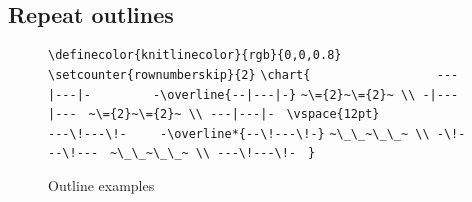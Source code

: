 \documentclass[draft]{amsart}
\begin{document}
\subsection{Repeat outlines}

\begin{figure}
\caption{Outline examples}\label{fig:outlineex}

\advance\hsize 60pt
\noindent \hskip -30pt
\begin{minipage}[b]{3in}
\obeylines
\verb?\definecolor{knitlinecolor}{rgb}{0,0,0.8}?
\verb?\setcounter{rownumberskip}{2}?
\verb?\chart{?
\verb?                 ---|---|- ?
\verb?       -\overline{--|---|-}?
\verb?~\={2}~\={2}~ \\ -|---|--- ?
\verb?~\={2}~\={2}~ \\ ---|---|- ?
\verb?\vspace{12pt}?
\verb?                ---\!---\!-?
\verb?    -\overline*{--\!---\!-}?
\verb?~\_\_~\_\_~ \\ -\!---\!--- ?
\verb?~\_\_~\_\_~ \\ ---\!---\!- ?
\vspace{0pt}
\verb?}?
\end{minipage}%
\hfill
\begin{minipage}[b]{105pt}
\knitnogrid
{}
\setcounter{rownumberskip}{2}
\vspace{0pt}
\end{minipage}%
\hfill
\begin{minipage}[b]{110pt}
\knitgrid
{}
\setcounter{rownumberskip}{2}
\vspace{0pt}
\end{minipage}
\end{figure}
\end{document}
